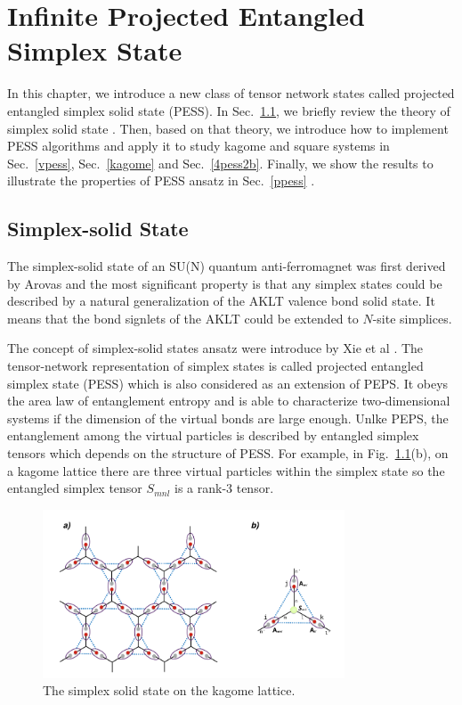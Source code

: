 \chapter{Infinite Projected Entangled Simplex State}
\label{chapter:ipess}
In this chapter, we introduce a new class of tensor network states called projected entangled simplex solid state (PESS). In Sec.~\ref{solidstate}, we briefly review the theory of simplex solid state \cite{PhysRevB.77.104404}. Then, based on that theory, we introduce how to implement PESS algorithms and apply it to study kagome and square systems in Sec.~\ref{vpess}, Sec.~\ref{kagome} and Sec.~\ref{4pess2b}. Finally, we show the results to illustrate the properties of PESS ansatz in Sec.~\ref{ppess} .
\section{Simplex-solid State}
\label{solidstate}
The simplex-solid state of an SU(N) quantum anti-ferromagnet was first derived by Arovas \cite{PhysRevB.77.104404} and the most significant property is that any simplex states could be described by a natural generalization of the AKLT \cite{PhysRevLett.59.799} \cite{Affleck1988} valence bond solid state. It means that the bond signlets of the AKLT could be extended to $N$-site simplices.

The concept of simplex-solid states ansatz were introduce by Xie et al \cite{PhysRevX.4.011025, PhysRevB.93.075154}. The tensor-network representation of simplex states is called projected entangled simplex state (PESS) which is also considered as an extension of PEPS. It obeys the area law \cite{RevModPhys.82.277} of entanglement entropy and is able to characterize two-dimensional systems if the dimension of the virtual bonds are large enough. Unlke PEPS, the entanglement among the virtual particles is described by entangled simplex tensors which depends on the structure of PESS. For example, in Fig.~\ref{fig411}(b), on a kagome lattice there are three virtual particles within the simplex state so the entangled simplex tensor $S_{mnl}$ is a rank-3 tensor.

\begin{figure}[ht]
	\centering
	\includegraphics[width=0.80\textwidth]{figures/fig411.png}
	\caption[The simplex solid state on the kagome lattice.]{The simplex solid state on the kagome lattice.}
	\label{fig411}
\end{figure}

